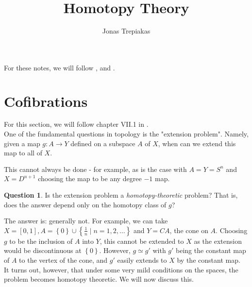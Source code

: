 \documentclass[reqno]{amsart}
\title{Homotopy Theory}
\author{Jonas Trepiakas}
\date{}
\theoremstyle{definition}
\newtheorem{question}[theorem]{Question}
\theoremstyle{remark}
\begin{document}
    
\maketitle

For these notes, we will follow \cite{Hatcher}, \cite{Bredon}
and \cite{ORW}.

\section{Cofibrations}
For this section, we will follow chapter VII.1 in \cite{Bredon}.\\
\linebreak
One of the fundamental questions in topology is the
"extension problem". Namely, given a map
$g \colon A \to Y$ defined on a subspace $A$ of $X$, when
can we extend this map to all of $X$.

This cannot always be done - for example, as is the case
with $A = Y = S^{n}$ and $X = D^{n+1}$ choosing the
map to be any degree $-1$ map.\\
\linebreak
\begin{question}
    Is the extension problem a \textit{homotopy-theoretic} problem?
    That is, does the answer depend only on the homotopy
    class of $g$?
\end{question}
The answer is: generally not. 
For example, we can take $X = \left[ 0,1 \right] ,
A = \left\{ 0 \right\} \cup \left\{ \frac{1}{n} \mid 
n=1, 2, \ldots \right\} $ and $Y = CA$, the cone
on $A$. Choosing $g$ to be the inclusion of
$A$ into $Y$, this cannot be extended to $X$ as the
extension would be discontinuous at $\left\{ 0 \right\} $.
However, $g \simeq g'$ with $g'$ being the constant
map of $A$ to the vertex of the cone, and $g'$ easily
extends to $X$ by the constant map.\\
\linebreak
It turns out, however, that under some very mild conditions
on the spaces, the problem becomes homotopy theoretic. 
We will now discuss this.
\end{document}
